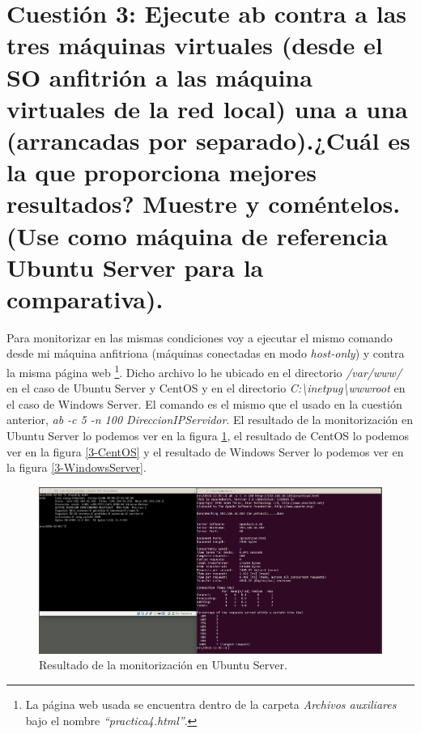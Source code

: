 \documentclass[a4paper,titlepage,12pt]{scrartcl}	%
\numberwithin{figure}{section} %
\numberwithin{table}{section} %
\begin{document}
	\section[Cuestión 3: Ejecute ab contra a las tres máquinas virtuales (desde el SO anfitrión a las máquina virtuales de la red local) una a una (arrancadas por separado).¿Cuál es la que proporciona mejores resultados? Muestre y coméntelos. (Use como máquina de referencia Ubuntu Server para la comparativa).]{Cuestión 3: Ejecute ab contra a las tres máquinas virtuales (desde el SO anfitrión a las máquina virtuales de la red local) una a una (arrancadas por separado).¿Cuál es la que proporciona mejores resultados? Muestre y coméntelos. (Use como máquina de referencia Ubuntu Server para la comparativa).}
	
	Para monitorizar en las mismas condiciones voy a ejecutar el mismo comando desde mi máquina anfitriona (máquinas conectadas en modo \textit{host-only}) y contra la misma página web \footnote{La página web usada se encuentra dentro de la carpeta \textit{Archivos auxiliares} bajo el nombre \textit{``practica4.html''}.}. Dicho archivo lo he ubicado en el directorio \textit{/var/www/} en el caso de Ubuntu Server y CentOS y en el directorio \textit{C:\textbackslash inetpug\textbackslash wwwroot} en el caso de Windows Server. El comando es el mismo que el usado en la cuestión anterior, \textit{ab -c 5 -n 100 DireccionIPServidor}. El resultado de la monitorización en Ubuntu Server lo podemos ver en la figura \ref{3-UbuntuServer}, el resultado de CentOS lo podemos ver en la figura \ref{3-CentOS} y el resultado de Windows Server lo podemos ver en la figura \ref{3-WindowsServer}.
	
	\begin{figure}[H]
		\includegraphics[width=\linewidth]{./Imagenes/3-UbuntuServer.png}
		\vspace{-0.5cm}
		\caption[Resultado de la monitorización en Ubuntu Server.]{Resultado de la monitorización en Ubuntu Server.}
		\label{3-UbuntuServer}
	\end{figure}
	
\end{document}
